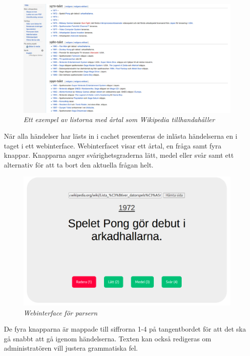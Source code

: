 \documentclass[a4paper, 11pt]{article}
\begin{document}
\begin{figure}[H]
	\begin{centering}
	\includegraphics[width=\textwidth]{Listbild} 
	\end{centering}
	\caption{\textit{Ett exempel av listorna med årtal som Wikipedia tillhandahåller}}
\end{figure}

När alla  händelser har lästs in i cachet presenteras de inlästa händelserna en i taget i ett webinterface. Webinterfacet visar ett årtal, en fråga samt fyra knappar. Knapparna anger svårighetsgraderna lätt, medel eller svår samt ett alternativ för att ta bort den aktuella frågan helt.

\begin{figure}[H]
	\begin{centering}
	\includegraphics[width=\textwidth]{crawler} 
	\end{centering}
	\caption{\textit{Webinterface för parsern}}
\end{figure}

De fyra knapparna är mappade till siffrorna 1-4 på tangentbordet för att det ska gå snabbt att gå igenom händelserna. Texten kan också redigeras om administratören vill justera grammatiska fel.
\end{document}
